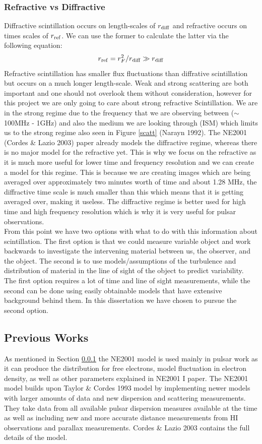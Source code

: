 \documentclass[10pt,a4paper]{article}
\begin{document}
\subsubsection{Refractive vs Diffractive} \label{RvD}
Diffractive scintillation occurs on length-scales of $r_{\ce{diff}}$ and refractive occurs on times scales of $r_{\ce{ref}}$. We can use the former to calculate the latter via the following equation:
\[ r_{\ce{ref}} = r_{F}^{2}/r_{\ce{diff}}\gg r_{\ce{diff}} \]
Refractive scintillation has smaller flux fluctuations than diffrative scintillation but occurs on a much longer length-scale. Weak and strong scattering are both important and one should not overlook them without consideration, however for this project we are only going to care about strong refractive Scintillation. We are in the strong regime due to the frequency that we are observing between ($\sim$100MHz - 1GHz) and also the medium we are looking through (ISM) which limits us to the strong regime also seen in Figure \ref{scatt} (Narayn 1992). The NE2001 (Cordes \& Lazio 2003) paper already models the diffractive regime, whereas there is no major model for the refractive yet. This is why we focus on the refractive as it is much more useful for lower time and frequency resolution and we can create a model for this regime. This is because we are creating images which are being averaged over approximately two minutes worth of time and about 1.28 MHz, the diffractive time scale is much smaller than this which means that it is getting averaged over, making it useless. The diffractive regime is better used for high time and high frequency resolution which is why it is very useful for pulsar observations.\\

From this point we have two options with what to do with this information about scintillation. The first option is that we could measure variable object and work backwards to investigate the intervening material between us, the observer, and the object. The second is to use models/assumptions of the turbulence and distribution of material in the line of sight of the object to predict variability. The first option requires a lot of time and line of sight measurements, while the second can be done using easily obtainable models that have extensive background behind them. In this dissertation we have chosen to pursue the second option. 
\subsection{Previous Works}
As mentioned in Section \ref{RvD} the NE2001 model is used mainly in pulsar work as it can produce the distribution for free electrons, model fluctuation in electron density, as well as other parameters explained in NE2001 I paper. The NE2001 model builds upon Taylor \& Cordes 1993 \citet{Taylor} model by implementing newer models with larger amounts of data and new dispersion and scattering measurements. They take data from all available pulsar dispersion measures available at the time as well as including new and more accurate distance measurements from HI observations and parallax measurements. Cordes \& Lazio 2003 \citet{Cordes} contains the full details of the model.\\
\end{document}
